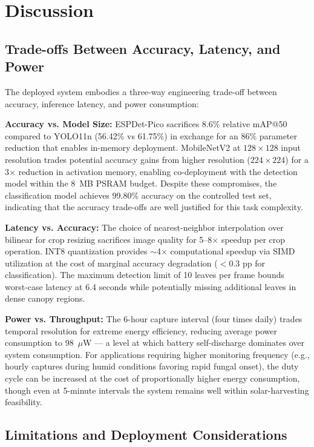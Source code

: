 \section{Discussion}
\label{sec:discussion}

\subsection{Trade-offs Between Accuracy, Latency, and Power}
\label{subsec:tradeoffs}

The deployed system embodies a three-way engineering trade-off between accuracy, inference latency, and power consumption:

\textbf{Accuracy vs. Model Size:} ESPDet-Pico sacrifices 8.6\% relative mAP@50 compared to YOLO11n (56.42\% vs 61.75\%) in exchange for an 86\% parameter reduction that enables in-memory deployment. MobileNetV2 at $128 \times 128$ input resolution trades potential accuracy gains from higher resolution ($224 \times 224$) for a 3$\times$ reduction in activation memory, enabling co-deployment with the detection model within the 8~MB PSRAM budget. Despite these compromises, the classification model achieves 99.80\% accuracy on the controlled test set, indicating that the accuracy trade-offs are well justified for this task complexity.

\textbf{Latency vs. Accuracy:} The choice of nearest-neighbor interpolation over bilinear for crop resizing sacrifices image quality for 5--8$\times$ speedup per crop operation. INT8 quantization provides $\sim$4$\times$ computational speedup via SIMD utilization at the cost of marginal accuracy degradation ($<$0.3 pp for classification). The maximum detection limit of 10 leaves per frame bounds worst-case latency at 6.4 seconds while potentially missing additional leaves in dense canopy regions.

\textbf{Power vs. Throughput:} The 6-hour capture interval (four times daily) trades temporal resolution for extreme energy efficiency, reducing average power consumption to 98~$\mu$W --- a level at which battery self-discharge dominates over system consumption. For applications requiring higher monitoring frequency (e.g., hourly captures during humid conditions favoring rapid fungal onset), the duty cycle can be increased at the cost of proportionally higher energy consumption, though even at 5-minute intervals the system remains well within solar-harvesting feasibility.

\subsection{Limitations and Deployment Considerations}
\label{subsec:limitations}

